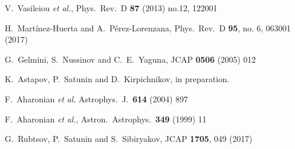 \documentclass{webofc}
\begin{document}
\begin{thebibliography}{99}
  V.~Vasileiou {\it et al.},
  Phys.\ Rev.\ D {\bf 87} (2013) no.12,  122001


  H.~Martínez-Huerta and A.~Pérez-Lorenzana,
  Phys.\ Rev.\ D {\bf 95}, no. 6, 063001 (2017)



  G.~Gelmini, S.~Nussinov and C.~E.~Yaguna,
  JCAP {\bf 0506} (2005) 012

	K.~Astapov, P.~Satunin and D.~Kirpichnikov, in preparation.	
	

  F.~Aharonian {\it et al.} %
  Astrophys.\ J.\  {\bf 614} (2004) 897
	
 F.~Aharonian {\it et al.},
  Astron.\ Astrophys.\  {\bf 349} (1999) 11  %

  G.~Rubtsov, P.~Satunin and S.~Sibiryakov,
  JCAP {\bf 1705}, 049 (2017)

\end{thebibliography}
\end{document}
